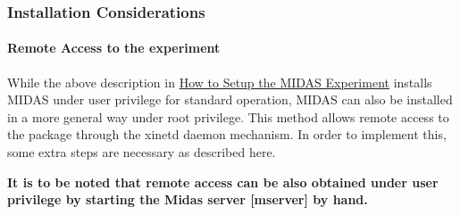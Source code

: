  \hypertarget{Q_Linux_Q_Linux_Installation_Considerations}{}\subsubsection{Installation Considerations}\label{Q_Linux_Q_Linux_Installation_Considerations}
\hypertarget{Q_Linux_Q_Linux_Remote_Access}{}\paragraph{Remote Access to the experiment}\label{Q_Linux_Q_Linux_Remote_Access}
While the above description in \hyperlink{Q_Linux_Q_Linux_Expt_Setup}{How to Setup the MIDAS Experiment} installs MIDAS under user privilege for standard operation, MIDAS can also be installed in a more general way under root privilege. This method allows remote access to the package through the xinetd daemon mechanism. In order to implement this, some extra steps are necessary as described here.


\begin{DoxyItemize}
\item {\bfseries  It is to be noted that remote access can be also obtained under user privilege by starting the Midas server \mbox{[}mserver\mbox{]} by hand.} 

\end{DoxyItemize}

